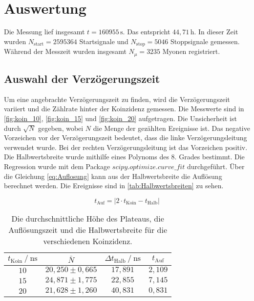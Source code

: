 \section{Auswertung}
\label{sec:auswertung}


Die Messung lief insgesamt $t = 160955 \, \unit{\second}$. Das entspricht $44,71 \, \unit{\hour}$. In dieser Zeit wurden $N_\text{start} = 2595364$ Startsignale und $N_\text{stop} = 5046$ Stoppsignale gemessen.
Während der Messzeit wurden insgesamt $N_{\mu} = 3235 $ Myonen registriert.

\subsection{Auswahl der Verzögerungszeit}
\label{sec:Verzögerungszeit}
Um eine angebrachte Verzögerungszeit zu finden, wird die Verzögerungszeit variiert und die Zählrate hinter der Koinzidenz gemessen.
Die Messwerte sind in \autoref{fig:koin_10}, \autoref{fig:koin_15} und \autoref{fig:koin_20} aufgetragen. Die Unsicherheit ist durch $ \sqrt{N}$ gegeben, wobei $N$ die Menge der gezählten Ereignisse ist.
Das negative Vorzeichen vor der Verzögerungszeit bedeutet, dass die linke Verzögerungsleitung verwendet wurde. Bei der rechten Verzögerungsleitung ist das Vorzeichen positiv.
Die Halbwertsbreite wurde mithilfe eines Polynoms des 8. Grades bestimmt. Die Regression wurde mit dem Package $scipy.optimize.curve\_ fit $  \cite{scipyop} durchgeführt. %
Über die Gleichung \eqref{eq:Auflosung} kann aus der Halbwertsbreite die Auflösung berechnet werden. Die Ereignisse sind in \autoref{tab:Halbwertsbreiten} zu sehen.

\begin{equation}
    t_\text{Auf} = \left|2 \cdot t_\text{Koin} - t_\text{Halb} \right|
    \label{eq:Auflosung}
\end{equation}

\begin{table}[H]
    \centering
    \caption{Die durchschnittliche Höhe des Plateaus, die Auflösungszeit und die Halbwertsbreite für die verschiedenen Koinzidenz.}
    \label{tab:Halbwertsbreiten}
    \begin{tabular}{c c c c}
    \toprule
     $t_\text{Koin} \mathbin{/} \unit{\nano\second} $ &$\bar{N}$ & $\Delta t_\text{Halb} \mathbin{/} \unit{\nano\second}$ & $t_\text{Auf}$ \\
    \midrule
        $10$&  $20,250 \pm 0,665$ &  $17,891$ & $2,109$\\ %
        $15$&  $24,871 \pm 1,775$ &  $22,855$ & $7,145$\\ %
        $20$&  $21,628 \pm 1,260$ &  $40,831$ & $0,831$\\ %
    \bottomrule
    \end{tabular}
    \end{table}


